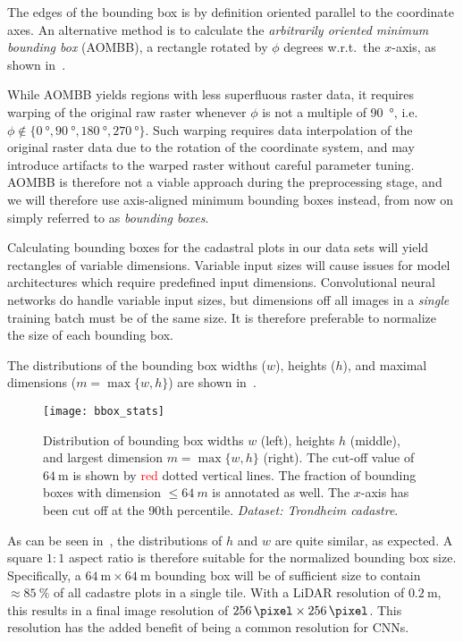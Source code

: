 The edges of the bounding box is by definition oriented parallel to the coordinate axes.
An alternative method is to calculate the \textit{arbitrarily oriented minimum bounding box} (AOMBB), a rectangle rotated by $\phi$ degrees w.r.t.\ the $x$-axis, as shown in~.

While AOMBB yields regions with less superfluous raster data, it requires warping of the original raw raster whenever $\phi$ is not a multiple of \SI{90}{\degree}, i.e.\ $\phi \not\in \{ \SI{0}{\degree}, \SI{90}{\degree}, \SI{180}{\degree}, \SI{270}{\degree} \}$.
Such warping requires data interpolation of the original raster data due to the rotation of the coordinate system, and may introduce artifacts to the warped raster without careful parameter tuning.
AOMBB is therefore not a viable approach during the preprocessing stage, and we will therefore use axis-aligned minimum bounding boxes instead, from now on simply referred to as \textit{bounding boxes}.

Calculating bounding boxes for the cadastral plots in our data sets will yield rectangles of variable dimensions.
Variable input sizes will cause issues for model architectures which require predefined input dimensions.
Convolutional neural networks do handle variable input sizes, but dimensions off all images in a \textit{single} training batch must be of the same size.
It is therefore preferable to normalize the size of each bounding box.

The distributions of the bounding box widths ($w$), heights ($h$), and maximal dimensions ($m = \max \{w, h\}$) are shown in~.

\begin{figure}[htb]
  \texttt{[image: bbox\_stats]}
  \caption{%
    Distribution of bounding box widths $w$ (left), heights $h$ (middle), and largest dimension $m = \max \{w, h\}$ (right).
    The cut-off value of $\SI{64}{\meter}$ is shown by \textcolor{red}{red} dotted vertical lines.
    The fraction of bounding boxes with dimension $\leq \SI{64}{m}$ is annotated as well.
    The $x$-axis has been cut off at the 90th percentile.
    \textit{Dataset: Trondheim cadastre}.
  }%
  \label{fig:bbox-stats}
\end{figure}

As can be seen in~, the distributions of $h$ and $w$ are quite similar, as expected.
A square $1:1$ aspect ratio is therefore suitable for the normalized bounding box size.
Specifically, a $\SI{64}{\meter} \times \SI{64}{\meter}$ bounding box will be of sufficient size to contain $\approx \SI{85}{\percent}$ of all cadastre plots in a single tile.
With a LiDAR resolution of $\SI{0.2}{\meter}$, this results in a final image resolution of $\SI{256}{\pixel} \times \SI{256}{\pixel}$.
This resolution has the added benefit of being a common resolution for CNNs.


